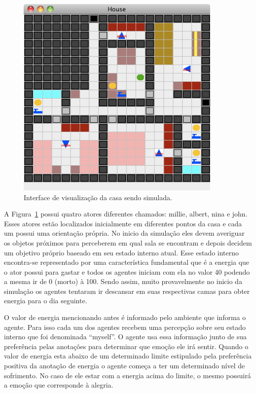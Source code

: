 \begin{figure}
	\begin{center}
		\includegraphics[width=10cm]{figuras/sims.png}
	\end{center}
	\caption{Interface de visualização da casa sendo simulada.}
	\label{fig:sims}
\end{figure}

A Figura~\ref{fig:sims} possui quatro atores diferentes chamados: millie,
albert, nina e john. Esses atores estão localizados inicialmente em diferentes
pontos da casa e cada um possui uma orientação própria. No inicio da simulação eles
devem averiguar os objetos próximos para perceberem em qual sala se encontram
e depois decidem um objetivo próprio baseado em seu estado interno atual.
Esse estado interno encontra-se representado por uma característica
fundamental que é a energia que o ator possui para gastar e todos os agentes
iniciam com ela no valor 40 podendo a mesma ir de 0 (morto) à 100. Sendo
assim, muito provavelmente no inicio da simulação os agentes tentaram ir
descansar em suas respectivas camas para obter energia para o dia seguinte.

O valor de energia mencionando antes é informado pelo ambiente que informa o
agente. Para isso cada um dos agentes recebem uma percepção sobre seu estado
interno que foi denominada ``myself''. O agente usa essa informação junto de
sua preferência pelas anotações para determinar que emoção ele irá sentir.
Quando o valor de energia esta abaixo de um determinado limite estipulado pela
preferência positiva da anotação de energia o agente começa a ter um
determinado nível de sofrimento. No caso de ele estar com a energia acima do
limite, o mesmo possuirá a emoção que corresponde à alegria.

